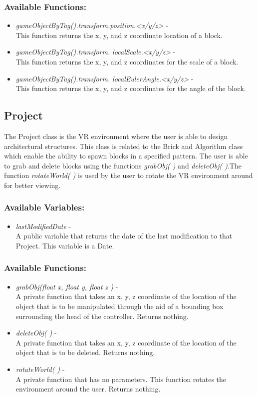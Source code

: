 \documentclass[draftclsnofoot,onecolumn,compsoc]{IEEEtran}
\begin{document}
\subsubsection{Available Functions:}
\begin{itemize}
\item \textit{gameObjectByTag().transform.position.<x/y/z> } -\\
This function returns the x, y, and z coordinate location of a block.
\item \textit{gameObjectByTag().transform. localScale.<x/y/z> } -\\
This function returns the x, y, and z coordinates for the scale of a block.
\item \textit{gameObjectByTag().transform. localEulerAngle.<x/y/z>  } -\\
This function returns the x, y, and z coordinates for the angle of the block.
\end{itemize}

\subsection{Project}
The Project class is the VR environment where the user is able to design architectural structures. This class is related to the Brick and Algorithm class which enable the ability to spawn blocks in a specified pattern. The user is able to grab and delete blocks using the functions \textit{grabObj( )} and \textit{deleteObj( )}.The function \textit{rotateWorld( )} is used by the user to rotate the VR environment around for better viewing.

\subsubsection{Available Variables:}
\begin{itemize}
\item \textit{lastModifiedDate} - \\
A public variable that returns the date of the last modification to that Project. This variable is a Date.
\end{itemize}

\subsubsection{Available Functions:}
\begin{itemize}
\item \textit{grabObj(float x, float y, float z )} -\\
A private function that takes an x, y, z coordinate of the location of the object that is to be manipulated through the aid of a bounding box surrounding the head of the controller. Returns nothing.
\item \textit{deleteObj( )} - \\
A private function that takes an x, y, z coordinate of the location of the object that is to be deleted. Returns nothing.
\item \textit{rotateWorld( )} -\\
A private function that has no parameters. This function rotates the environment around the user. Returns nothing.
\end{itemize}
\end{document}
